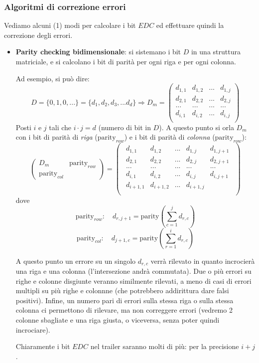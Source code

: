 \documentclass[a4paper,11pt]{article}
\begin{document}
\subsubsection{Algoritmi di correzione errori}
Vediamo alcuni (1) modi per calcolare i bit $EDC$ ed effettuare quindi la correzione degli errori.
\begin{itemize}
	\item \textbf{Parity checking bidimensionale}: si sistemano i bit $D$ in una struttura matriciale, e si calcolano i bit di parità per ogni riga e per ogni colonna. 

		Ad esempio, si può dire:
$$
D = \{ 0, 1, 0, ... \} = \{ d_1, d_2, d_3, ... d_d \} \Rightarrow D_m = 
\begin{pmatrix}
	d_{1,1} & d_{1,2} & ... & d_{1,j} \\ 
	d_{2,1} & d_{2,2} & ... & d_{2,j} \\ 
	... & ... & ... & ... \\
	d_{i,1} & d_{i,2} & ... & d_{i,j} \\ 
\end{pmatrix}
$$
Posti $i$ e $j$ tali che $i \cdot j = d$ (numero di bit in $D$).
A questo punto si orla $D_m$ con i bit di parità di \textit{riga} ($\text{parity}_{row}$) e i bit di parità di \textit{colonna} ($\text{parity}_{row}$):
$$
\begin{pmatrix}
	D_m & \text{parity}_{row} \\
	\text{parity}_{col}
\end{pmatrix}
=
\begin{pmatrix}
\begin{array}{cccc|c}
	d_{1,1} & d_{1,2} & ... & d_{1,j} & d_{1, j + 1} \\ 
	d_{2,1} & d_{2,2} & ... & d_{2,j} & d_{2, j + 1} \\ 
	... & ... & ... & ... & ...\\
	d_{i,1} & d_{i,2} & ... & d_{i,j} & d_{i, j + 1} \\ \hline 
	d_{i + 1, 1} & d_{i + 1, 2} & ... & d_{i + 1, j}  \\ 
\end{array}
\end{pmatrix}
$$
dove
$$
\text{parity}_{row}: \quad d_{r, j + 1} = \text{parity}\left( \sum_{c = 1}^{j} d_{r, c} \right)
$$
$$
\text{parity}_{col}: \quad d_{j + 1, c} = \text{parity}\left( \sum_{r = 1}^{i} d_{r, c} \right)
$$

A questo punto un errore su un singolo $d_{r, c}$ verrà rilevato in quanto incrocierà una riga e una colonna (l'intersezione andrà commutata).
Due o più errori su righe e colonne disgiunte veranno similmente rilevati, a meno di casi di errori multipli su più righe e colonnne (che potrebbero addirittura dare falsi positivi).
Infine, un numero pari di errori sulla stessa riga o sulla stessa colonna ci permettono di rilevare, ma non correggere errori (vedremo 2 colonne sbagliate e una riga giusta, o viceversa, senza poter quindi incrociare).

Chiaramente i bit $EDC$ nel trailer saranno molti di più: per la precisione $i + j$.

\end{itemize}
\end{document}
